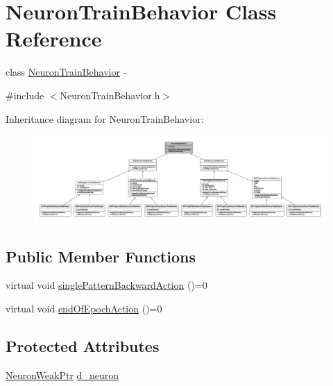 \hypertarget{class_neuron_train_behavior}{
\section{NeuronTrainBehavior Class Reference}
\label{class_neuron_train_behavior}
}


class \hyperlink{class_neuron_train_behavior}{NeuronTrainBehavior} -\/  




{\ttfamily \#include $<$NeuronTrainBehavior.h$>$}



Inheritance diagram for NeuronTrainBehavior:
\nopagebreak
\begin{figure}[H]
\begin{center}
\leavevmode
\includegraphics[width=400pt]{class_neuron_train_behavior__inherit__graph}
\end{center}
\end{figure}
\subsection*{Public Member Functions}
\begin{DoxyCompactItemize}
\item 
virtual void \hyperlink{class_neuron_train_behavior_a681941afee362fd3e2b820a791037860}{singlePatternBackwardAction} ()=0
\item 
virtual void \hyperlink{class_neuron_train_behavior_aca0b761f636bb48c88dfa6c955c7377a}{endOfEpochAction} ()=0
\end{DoxyCompactItemize}
\subsection*{Protected Attributes}
\begin{DoxyCompactItemize}
\item 
\hyperlink{_a_m_o_r_e_8h_a3e2d414e247d33f77957e70765d161c0}{NeuronWeakPtr} \hyperlink{class_neuron_train_behavior_a9c10df775cf7a1d0a62e6b66d9cf07cd}{d\_\-neuron}
\end{DoxyCompactItemize}


